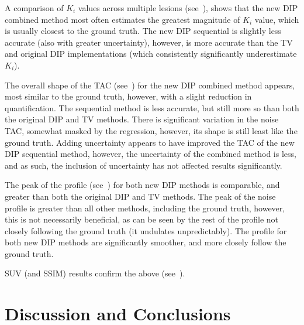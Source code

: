         A comparison of $K_i$ values across multiple lesions (see~), shows that the new \gls{DIP} combined method most often estimates the greatest magnitude of $K_i$ value, which is usually closest to the ground truth. The new \gls{DIP} sequential is slightly less accurate (also with greater uncertainty), however, is more accurate than the \gls{TV} and original \gls{DIP} implementations (which consistently significantly underestimate $K_i$).
        
        The overall shape of the \gls{TAC} (see~) for the new \gls{DIP} combined method appears, most similar to the ground truth, however, with a slight reduction in quantification. The sequential method is less accurate, but still more so than both the original \gls{DIP} and \gls{TV} methods. There is significant variation in the noise \gls{TAC}, somewhat masked by the regression, however, its shape is still least like the ground truth. Adding uncertainty appears to have improved the \gls{TAC} of the new \gls{DIP} sequential method, however, the uncertainty of the combined method is less, and as such, the inclusion of uncertainty has not affected results significantly.
        
        The peak of the profile (see~) for both new \gls{DIP} methods is comparable, and greater than both the original \gls{DIP} and \gls{TV} methods. The peak of the noise profile is greater than all other methods, including the ground truth, however, this is not necessarily beneficial, as can be seen by the rest of the profile not closely following the ground truth (it undulates unpredictably). The profile for both new \gls{DIP} methods are significantly smoother, and more closely follow the ground truth.
         
        \gls{SUV} (and \gls{SSIM}) results confirm the above (see~).
    
    \section{Discussion and Conclusions} \label{sec:pseudo_bayesian_dip_denoising_as_a_preprocessing_step_for_kinetic_modelling_in_dynamic_pet_appendix_discussion_and_conclusions}
    
